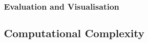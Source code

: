 \documentclass[11pt,twoside]{article}
\newtheorem{Corollary}{Corollary}
\newtheorem{Proposition}{Proposition}
\numberwithin{Theorem}{section}
\numberwithin{Definition}{section}
\numberwithin{Lemma}{section}
\numberwithin{Algorithm}{section}
\numberwithin{equation}{section}
\begin{document}
\subsubsection{Evaluation and Visualisation}

\subsection{Computational Complexity}




\end{document}
